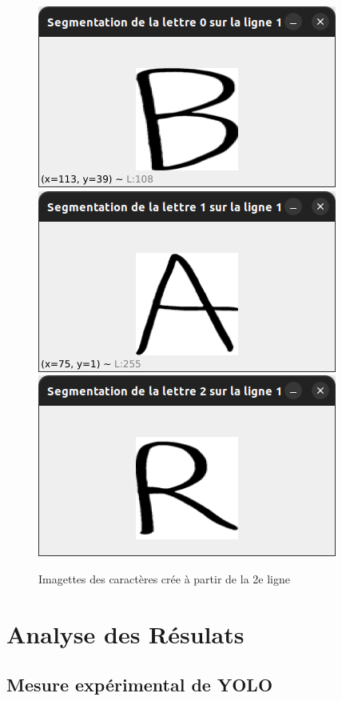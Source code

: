 \documentclass[a4paper]{article}
\begin{document}
			\begin{figure}
				\caption{Imagettes des caractères crée à partir de la 2e ligne}
				\includegraphics[scale=.3]{segmentation_B.png}
				\centering
				\includegraphics[scale=.3]{segmentation_A.png}
				\centering
				\includegraphics[scale=.3]{segmentation_R.png}
				\centering
			\end{figure}
	\newpage
	\section{Analyse des Résulats}
		\subsection{Mesure expérimental de YOLO}
\end{document}
